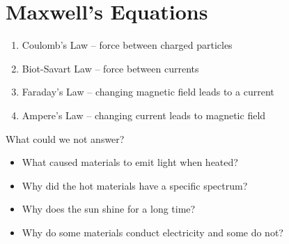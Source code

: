 \documentclass[a4paper, 11pt, fleqn, normalem]{report}
\begin{document}
\section{Maxwell's Equations}
\begin{enumerate}
    \item Coulomb's Law -- force between charged particles
    \item Biot-Savart Law -- force between currents
    \item Faraday's Law -- changing magnetic field leads to a current
    \item Ampere's Law -- changing current leads to magnetic field
\end{enumerate}
What could we not answer?
\begin{itemize}
    \item What caused materials to emit light when heated?
    \item Why did the hot materials have a specific spectrum?
    \item Why does the sun shine for a long time?
    \item Why do some materials conduct electricity and some do not?
\end{itemize}
\end{document}
